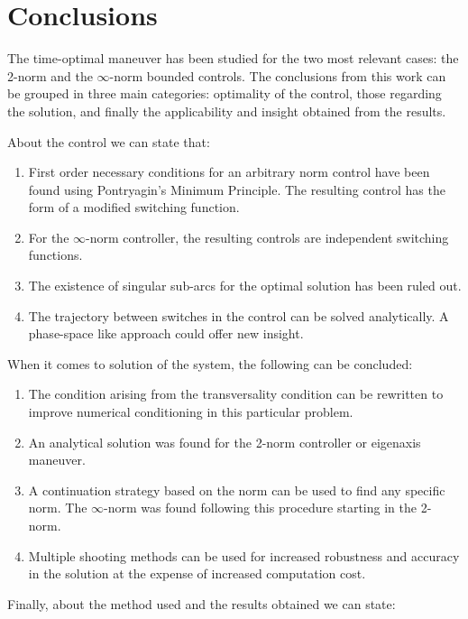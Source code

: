 \section{Conclusions}
The time-optimal maneuver has been studied for the two most relevant cases: the 2-norm and the $\infty$-norm bounded controls. The conclusions from this work can be grouped in three main categories: optimality of the control, those regarding the solution, and finally the applicability and insight obtained from the results.

About the control we can state that:
\begin{enumerate}
	\item First order necessary conditions for an arbitrary norm control have been found using Pontryagin's Minimum Principle. The resulting control has the form of a modified switching function.
	
	\item For the $\infty$-norm controller, the resulting controls are independent switching functions.
	
	\item The existence of singular sub-arcs for the optimal solution has been ruled out.
	
	\item The trajectory between switches in the control can be solved analytically. A phase-space like approach could offer new insight.
\end{enumerate}

When it comes to solution of the system, the following can be concluded:
\begin{enumerate}
	\item The condition arising from the transversality condition can be rewritten to improve numerical conditioning in this particular problem.
	
	\item An analytical solution was found for the 2-norm controller or eigenaxis maneuver.
	
	\item A continuation strategy based on the norm can be used to find any specific norm. The $\infty$-norm was found following this procedure starting in the 2-norm.
	
	\item Multiple shooting methods can be used for increased robustness and accuracy in the solution at the expense of increased computation cost.
\end{enumerate}
	
Finally, about the method used and the results obtained we can state:

